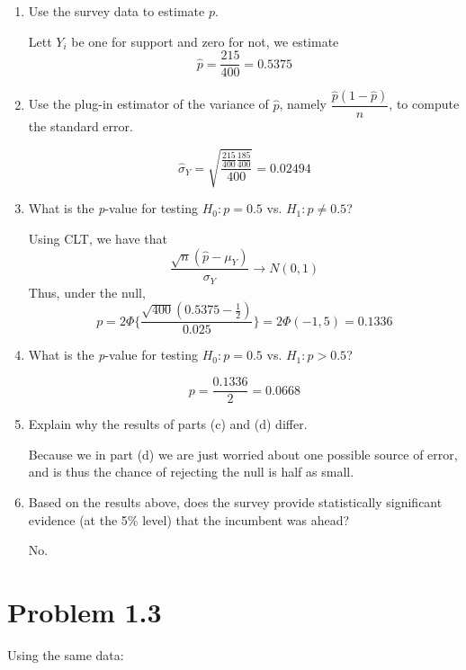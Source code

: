 \documentclass[11pt]{article}
\begin{document}
\begin{enumerate}[label=(\alph*)]
    \item Use the survey data to estimate \( p \).
    \begin{solution}
    Lett $Y_i$ be one for support and zero for not, we estimate
        \[\hat{p} = \frac{215}{400} = 0.5375\]
    \end{solution}
    \item Use the plug-in estimator of the variance of \( \hat{p} \), namely \( \dfrac{\hat{p}(1 - \hat{p})}{n} \), to compute the standard error.
    \begin{solution}
        \[\hat\sigma_Y = \sqrt{\frac{\frac{215}{400}\frac{185}{400}}{400}} =0.02494 \]
    \end{solution}
    \item What is the \emph{p}-value for testing \( H_0: p = 0.5 \) vs. \( H_1: p \ne 0.5 \)?
    \begin{solution}
        Using CLT, we have that 
        \[\frac{\sqrt{n}(\hat p - \mu_Y)}{\sigma_Y} \to N(0,1) \]
        Thus, under the null,
        \[p = 2\Phi\{\frac{\sqrt{400}(0.5375 - \frac{1}{2})}{0.025}\} = 2\Phi(-1,5) = 0.1336\]
    \end{solution}
    \item What is the \emph{p}-value for testing \( H_0: p = 0.5 \) vs. \( H_1: p > 0.5 \)?
    \begin{solution}
        \[p = \frac{0.1336}{2} = 0.0668\]
    \end{solution}
    \item Explain why the results of parts (c) and (d) differ.
    \begin{solution}
        Because we in part (d) we are just worried about one possible source of error, and is thus the chance of rejecting the null is half as small.
    \end{solution}
    \item Based on the results above, does the survey provide statistically significant evidence (at the 5\% level) that the incumbent was ahead?
    \begin{solution}
        No. 
    \end{solution}
\end{enumerate}

\section*{Problem 1.3}

Using the same data:
\end{document}
